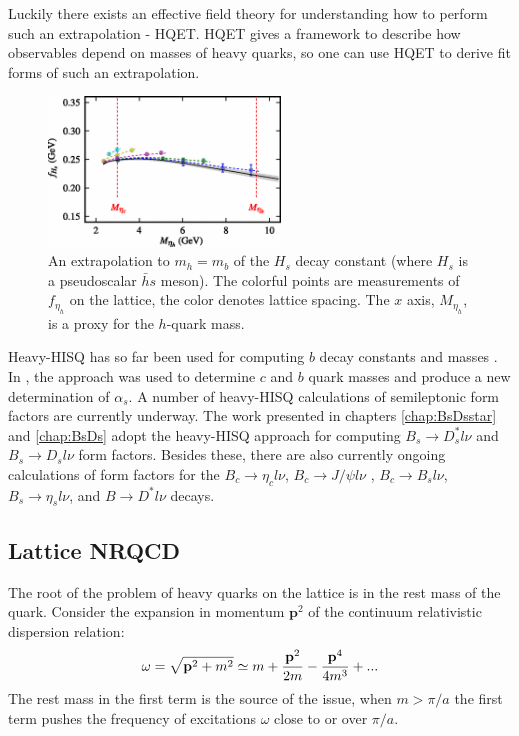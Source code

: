     Luckily there exists an effective field theory for understanding how to perform such an extrapolation - HQET. HQET gives a framework to describe how observables depend on masses of heavy quarks, so one can use HQET to derive fit forms of such an extrapolation.

    \begin{figure}
      \begin{center}
        \includegraphics[width=
          0.55\textwidth]{images/fHs_heavyhisq.png}
      \end{center}
      \vspace{-5pt}
      \caption{An extrapolation to $m_h=m_b$ of the $H_s$ decay constant (where $H_s$ is a pseudoscalar $\bar{h}s$ meson)\cite{McNeile:2012qf}. The colorful points are measurements of $f_{\eta_h}$ on the lattice, the color denotes lattice spacing. The $x$ axis, $M_{\eta_h}$, is a proxy for the $h$-quark mass. \label{fig:McNeile}}
    \end{figure}

    Heavy-HISQ has so far been used for computing $b$ decay constants and masses \cite{McNeile:2011ng,McNeile:2012qf,Bazavov:2017lyh}. In \cite{McNeile:2010ji}, the approach was used to determine $c$ and $b$ quark masses and produce a new determination of $\alpha_s$. A number of heavy-HISQ calculations of semileptonic form factors are currently underway. The work presented in chapters \ref{chap:BsDsstar} and \ref{chap:BsDs} adopt the heavy-HISQ approach for computing $B_s\to D_s^*l\nu$ and $B_s\to D_sl\nu$ form factors. Besides these, there are also currently ongoing calculations of form factors for the $B_c\to \eta_cl\nu$, $B_c\to J/\psi l\nu$ \cite{Lytle:2016ixw}, $B_c\to B_sl\nu$, $B_s\to \eta_sl\nu$, and $B\to D^*l\nu$ decays.

    \subsection{Lattice NRQCD}

    The root of the problem of heavy quarks on the lattice is in the rest mass of the quark. Consider the expansion in momentum $\textbf{p}^2$ of the continuum relativistic dispersion relation:
    \begin{align}
      \omega = \sqrt{{\textbf{p}}^2 + m^2} \simeq m + {{\textbf{p}}^2\over 2m} - {{\textbf{p}}^4\over 4m^3} + ...
      \label{eq:rel_expansion}
    \end{align}
The rest mass in the first term is the source of the issue, when $m > \pi/a$ the first term pushes the frequency of excitations $\omega$ close to or  over $\pi/a$.

